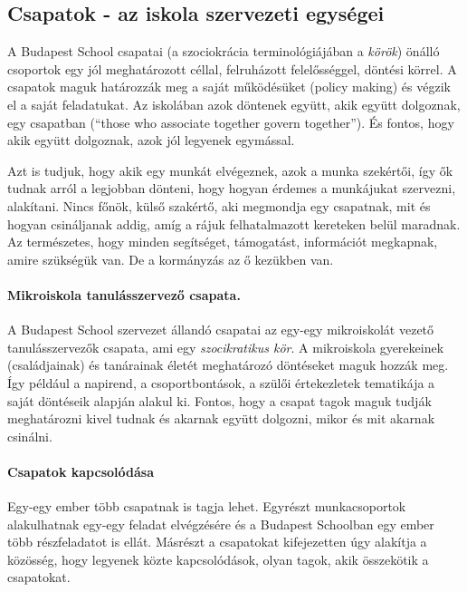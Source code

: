\subsection{Csapatok - az iskola szervezeti
egységei}

A Budapest School csapatai (a szociokrácia terminológiájában a
\emph{körök}) önálló csoportok egy jól meghatározott céllal, felruházott
felelősséggel, döntési körrel. A csapatok maguk határozzák meg a saját
működésüket (policy making) és végzik el a saját feladatukat. Az
iskolában azok döntenek együtt, akik együtt dolgoznak, egy csapatban
(``those who associate together govern together''). És fontos, hogy akik
együtt dolgoznak, azok jól legyenek egymással.

Azt is tudjuk, hogy akik egy munkát elvégeznek, azok a munka szekértői,
így ők tudnak arról a legjobban dönteni, hogy hogyan érdemes a
munkájukat szervezni, alakítani. Nincs főnök, külső szakértő, aki
megmondja egy csapatnak, mit és hogyan csináljanak addig, amíg a rájuk
felhatalmazott kereteken belül maradnak. Az természetes, hogy minden
segítséget, támogatást, információt megkapnak, amire szükségük van. De a
kormányzás az ő kezükben van.


\paragraph{Mikroiskola tanulásszervező
csapata.}

A Budapest School szervezet állandó csapatai az egy-egy mikroiskolát
vezető tanulásszervezők csapata, ami egy \emph{szocikratikus kör}. A
mikroiskola gyerekeinek (családjainak) és tanárainak életét meghatározó
döntéseket maguk hozzák meg. Így például a napirend, a csoportbontások,
a szülői értekezletek tematikája a saját döntéseik alapján alakul ki.
Fontos, hogy a csapat tagok maguk tudják meghatározni kivel tudnak és
akarnak együtt dolgozni, mikor és mit akarnak csinálni.


\paragraph{Csapatok kapcsolódása}

Egy-egy ember több csapatnak is tagja lehet. Egyrészt munkacsoportok
alakulhatnak egy-egy feladat elvégzésére és a Budapest Schoolban egy
ember több részfeladatot is ellát. Másrészt a csapatokat kifejezetten
úgy alakítja a közösség, hogy legyenek közte kapcsolódások, olyan tagok,
akik összekötik a csapatokat.

